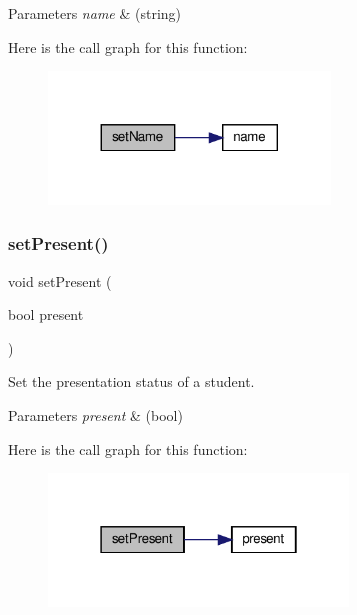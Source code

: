 \begin{DoxyParams}{Parameters}
{\em name} & (string) \\
\hline
\end{DoxyParams}
Here is the call graph for this function\+:
\nopagebreak
\begin{figure}[H]
\begin{center}
\leavevmode
\includegraphics[width=212pt]{classStudent_a9d3a2685df23b5e7cbf59c19c4a1f9b5_cgraph}
\end{center}
\end{figure}
\mbox{\label{classStudent_a4b5a0a2d5e64a49f91f50c790ae3147a}} 
\subsubsection{\texorpdfstring{set\+Present()}{setPresent()}}
{\footnotesize\ttfamily void set\+Present (\begin{DoxyParamCaption}\item[{bool}]{present }\end{DoxyParamCaption})}



Set the presentation status of a student. 


\begin{DoxyParams}{Parameters}
{\em present} & (bool) \\
\hline
\end{DoxyParams}
Here is the call graph for this function\+:
\nopagebreak
\begin{figure}[H]
\begin{center}
\leavevmode
\includegraphics[width=226pt]{classStudent_a4b5a0a2d5e64a49f91f50c790ae3147a_cgraph}
\end{center}
\end{figure}


